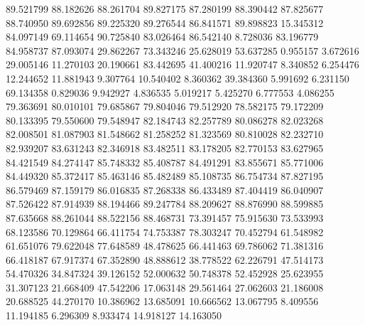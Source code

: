 89.521799
88.182626
88.261704
89.827175
87.280199
88.390442
87.825677
88.740950
89.692856
89.225320
89.276544
86.841571
89.898823
15.345312
84.097149
69.114654
90.725840
83.026464
86.542140
8.728036
83.196779
84.958737
87.093074
29.862267
73.343246
25.628019
53.637285
0.955157
3.672616
29.005146
11.270103
20.190661
83.442695
41.400216
11.920747
8.340852
6.254476
12.244652
11.881943
9.307764
10.540402
8.360362
39.384360
5.991692
6.231150
69.134358
0.829036
9.942927
4.836535
5.019217
5.425270
6.777553
4.086255
79.363691
80.010101
79.685867
79.804046
79.512920
78.582175
79.172209
80.133395
79.550600
79.548947
82.184743
82.257789
80.086278
82.023268
82.008501
81.087903
81.548662
81.258252
81.323569
80.810028
82.232710
82.939207
83.631243
82.346918
83.482511
83.178205
82.770153
83.627965
84.421549
84.274147
85.748332
85.408787
84.491291
83.855671
85.771006
84.449320
85.372417
85.463146
85.482489
85.108735
86.754734
87.827195
86.579469
87.159179
86.016835
87.268338
86.433489
87.404419
86.040907
87.526422
87.914939
88.194466
89.247784
88.209627
88.876990
88.599885
87.635668
88.261044
88.522156
88.468731
73.391457
75.915630
73.533993
68.123586
70.129864
66.411754
74.753387
78.303247
70.452794
61.548982
61.651076
79.622048
77.648589
48.478625
66.441463
69.786062
71.381316
66.418187
67.917374
67.352890
48.888612
38.778522
62.226791
47.514173
54.470326
34.847324
39.126152
52.000632
50.748378
52.452928
25.623955
31.307123
21.668409
47.542206
17.063148
29.561464
27.062603
21.186008
20.688525
44.270170
10.386962
13.685091
10.666562
13.067795
8.409556
11.194185
6.296309
8.933474
14.918127
14.163050
